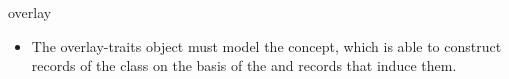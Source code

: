 \begin{ccRefFunction}{overlay}
\ccRequirements
\begin{itemize}
\item The overlay-traits object  must model the 
  concept, which is able to construct records of the  class on
  the basis of the  and  records that induce them.
\end{itemize}

\ccSeeAlso

\end{ccRefFunction}

\ccRefPageEnd
